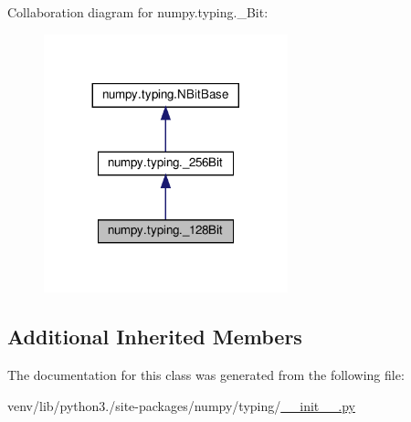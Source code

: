 Collaboration diagram for numpy.\+typing.\+\_\+Bit\+:
\nopagebreak
\begin{figure}[H]
\begin{center}
\leavevmode
\includegraphics[width=200pt]{classnumpy_1_1typing_1_1__128Bit__coll__graph}
\end{center}
\end{figure}
\subsection*{Additional Inherited Members}


The documentation for this class was generated from the following file\+:\begin{DoxyCompactItemize}
\item 
venv/lib/python3./site-\/packages/numpy/typing/\hyperlink{venv_2lib_2python3_89_2site-packages_2numpy_2typing_2____init_____8py}{\+\_\+\+\_\+init\+\_\+\+\_\+.\+py}\end{DoxyCompactItemize}
